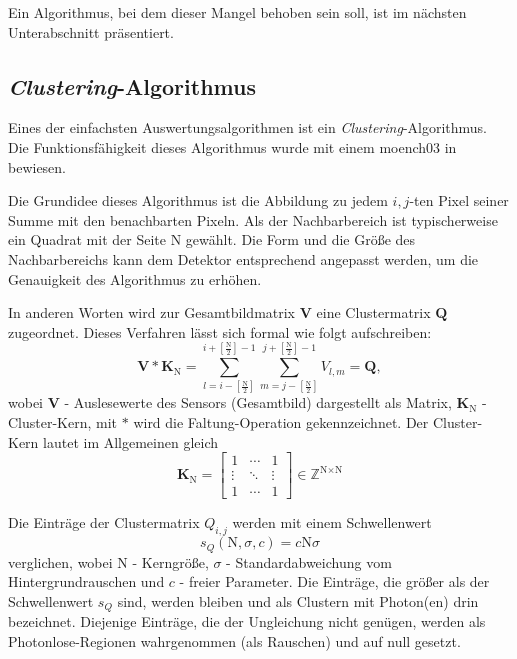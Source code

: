 \noindent
Ein Algorithmus, bei dem dieser Mangel behoben sein soll, ist im nächsten Unterabschnitt präsentiert.

\subsection{\emph{Clustering}-Algorithmus}
\label{text:clustering_algorithm}
Eines der einfachsten Auswertungsalgorithmen ist ein \emph{Clustering}-Algorithmus. Die Funktionsfähigkeit dieses Algorithmus wurde mit einem \gls{moench03} in \cite{cartier_micron_2014} bewiesen.

\noindent
Die Grundidee dieses Algorithmus ist die Abbildung zu jedem $i,j$-ten Pixel seiner Summe mit den benachbarten Pixeln. Als der Nachbarbereich ist typischerweise ein Quadrat mit der Seite N gewählt. Die Form und die Größe des Nachbarbereichs kann dem Detektor entsprechend angepasst werden, um die Genauigkeit des Algorithmus zu erhöhen.

\noindent
In anderen Worten wird zur Gesamtbildmatrix $\mathbf{V}$ eine Clustermatrix $\mathbf{Q}$ zugeordnet. Dieses Verfahren lässt sich formal wie folgt aufschreiben:
\begin{equation}
    \mathbf{V} * \mathbf{K}_{\text{N}} = \sum_{l=i-\left[\frac{\text{N}}{2}\right]}^{i+\left[\frac{\text{N}}{2}\right]-1} \sum_{m=j-\left[\frac{\text{N}}{2}\right]}^{j+\left[\frac{\text{N}}{2}\right]-1} V_{l,m} = \mathbf{Q},
\end{equation}
wobei $\mathbf{V}$ - Auslesewerte des Sensors (Gesamtbild) dargestellt als Matrix, $\mathbf{K}_{\text{N}}$ - Cluster-Kern, mit $*$ wird die Faltung-Operation gekennzeichnet. Der Cluster-Kern lautet im Allgemeinen gleich
\begin{equation}
    \mathbf{K}_\text{N} = \begin{bmatrix}
1 & \cdots & 1\\
\vdots & \ddots & \vdots\\
1 & \cdots & 1
\end{bmatrix}
\in \mathbb{Z}^{\text{N}\times \text{N}}
\end{equation}

\noindent
Die Einträge der Clustermatrix $Q_{i,j}$ werden mit einem Schwellenwert 
\begin{equation}
    s_Q(\text{N}, \sigma, c) = c\text{N}\sigma
\end{equation}
verglichen, wobei N - Kerngröße, $\sigma$ - Standardabweichung vom Hintergrundrauschen und $c$ - freier Parameter. Die Einträge, die größer als der Schwellenwert $s_Q$ sind, werden bleiben und als Clustern mit Photon(en) drin bezeichnet. Diejenige Einträge, die der Ungleichung nicht genügen, werden als Photonlose-Regionen wahrgenommen (als Rauschen) und auf null gesetzt.

